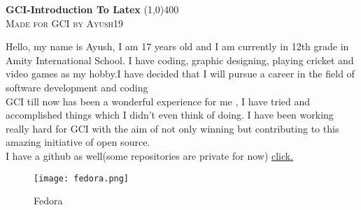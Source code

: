 \documentclass[12pt]{article}
\begin{document}
	\begin{center}
	\huge{\bfseries GCI-Introduction To Latex}
	\line(1,0){400}\\
	[0.4cm]
	\textsc{\Large Made for GCI by Ayush19}\\
	[0.5cm]
	\end{center}
	{\Large Hello, my name is Ayush, I am 17 years old and I am currently in 12th grade in Amity International School. I have coding, graphic designing, playing cricket and video games as my hobby.I have decided that I will pursue a career in the field of software development and coding}\\
	[0.5cm]
	{\Large GCI till now has been a wonderful experience for me , I have tried and accomplished things which I didn't even think of doing. I have been working really hard for GCI with the aim of not only winning but contributing to this amazing initiative of open source.}\\
        [0.5cm]
	{\Large I have a github  as well(some repositories are private for now) \href{https://github.com/Ayush19-01}{click.}}
	\begin{figure}[b!]
	\texttt{[image: fedora.png]}
	\caption{Fedora}
	\label{fig:Logo}
        \end{figure}
\end{document}
